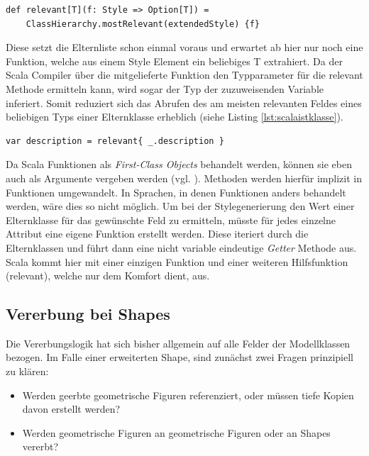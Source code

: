 \begin{lstlisting}[style=scala, caption = {Hilfsfunktion relevant}, label = {lst:defrelevant}]
def relevant[T](f: Style => Option[T]) =
    ClassHierarchy.mostRelevant(extendedStyle) {f}
\end{lstlisting}Diese setzt die Elternliste schon einmal voraus und erwartet ab hier nur noch eine Funktion, welche aus einem Style Element ein beliebiges T extrahiert.
Da der Scala Compiler über die mitgelieferte Funktion den Typparameter für die relevant Methode ermitteln kann, wird sogar der Typ der zuzuweisenden Variable inferiert. Somit reduziert sich das Abrufen des am meisten relevanten Feldes eines beliebigen Typs einer Elternklasse erheblich (siehe Listing \ref{lst:scalaistklasse}).
\begin{lstlisting}[style=scala, caption = {Beispielaufruf um die latest-Bound description der Eterninstanzen zu ermitteln}, label = {lst:scalaistklasse}]
var description = relevant{ _.description }
\end{lstlisting}Da Scala Funktionen als \textit{First-Class Objects} behandelt werden, können sie eben auch als Argumente vergeben werden (vgl. ). Methoden werden hierfür implizit in Funktionen umgewandelt. In Sprachen, in denen Funktionen anders behandelt werden, wäre dies so nicht möglich. Um bei der Stylegenerierung den Wert einer Elternklasse für das gewünschte Feld zu ermitteln, müsste für jedes einzelne Attribut eine eigene Funktion erstellt werden. Diese iteriert durch die Elternklassen und führt dann eine nicht variable eindeutige \textit{Getter} Methode aus. Scala kommt hier mit einer einzigen Funktion und einer weiteren Hilfsfunktion (relevant), welche nur dem Komfort dient, aus.

\subsection{Vererbung bei Shapes}\label{shapeinheritance}Die Vererbungslogik hat sich bisher allgemein auf alle Felder der Modellklassen bezogen. Im Falle einer erweiterten Shape, sind zunächst zwei Fragen prinzipiell zu klären:
\begin{itemize}
\item Werden geerbte geometrische Figuren referenziert, oder müssen tiefe Kopien davon erstellt werden?
\item Werden geometrische Figuren an geometrische Figuren oder an Shapes vererbt?
\end{itemize}
